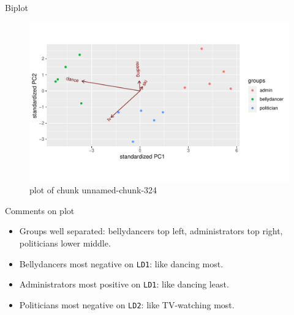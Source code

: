 \documentclass[ignorenonframetext,]{beamer}
\newenvironment{Shaded}{\begin{snugshade}}{\end{snugshade}}
\newcommand{\DataTypeTok}[1]{\textcolor[rgb]{0.13,0.29,0.53}{#1}}
\newcommand{\FloatTok}[1]{\textcolor[rgb]{0.00,0.00,0.81}{#1}}
\newcommand{\KeywordTok}[1]{\textcolor[rgb]{0.13,0.29,0.53}{\textbf{#1}}}
\newcommand{\NormalTok}[1]{#1}
\newcommand{\OperatorTok}[1]{\textcolor[rgb]{0.81,0.36,0.00}{\textbf{#1}}}
\begin{document}
\begin{frame}[fragile]{Biplot}
\protect\hypertarget{biplot}{}

\begin{Shaded}
\end{Shaded}

\begin{figure}
\centering
\includegraphics{figure/unnamed-chunk-324-1.pdf}
\caption{plot of chunk unnamed-chunk-324}
\end{figure}

\end{frame}

\begin{frame}[fragile]{Comments on plot}
\protect\hypertarget{comments-on-plot}{}

\begin{itemize}
\item
  Groups well separated: bellydancers top left, administrators top
  right, politicians lower middle.
\item
  Bellydancers most negative on \texttt{LD1}: like dancing most.
\item
  Administrators most positive on \texttt{LD1}: like dancing least.
\item
  Politicians most negative on \texttt{LD2}: like TV-watching most.
\end{itemize}

\end{frame}
\end{document}

